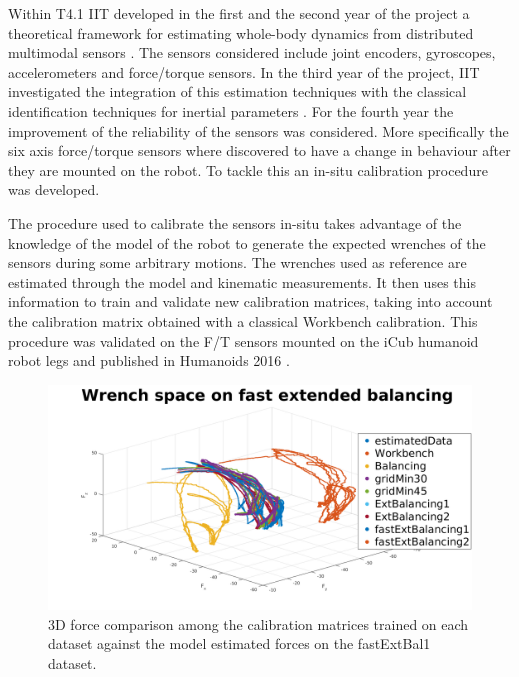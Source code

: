 Within T4.1 IIT developed in the first and the second year of the 
project a theoretical framework for estimating whole-body
dynamics from distributed multimodal sensors \cite{nori2015}. The sensors considered
include joint encoders, gyroscopes, accelerometers and force/torque sensors. In the third year of the project, IIT investigated the integration of this estimation techniques with the classical identification techniques for inertial parameters \cite{traversaro2015parametersEM}. For the fourth year the improvement of the reliability of the sensors was considered. More specifically the six axis force/torque sensors where discovered to have a change in behaviour after they are mounted on the robot. To tackle this an in-situ calibration procedure was developed.

The procedure used to calibrate the sensors in-situ takes advantage of the knowledge of the model of the robot to generate the expected wrenches of the sensors during some arbitrary motions. The wrenches used as reference are estimated through the model and kinematic measurements. It then uses this information to train and validate new calibration matrices, taking into account the calibration matrix obtained with a classical Workbench calibration.  This procedure was validated  on the F/T sensors mounted on the iCub humanoid robot legs and published in Humanoids 2016 \cite{Andrade}.


\begin{figure}
        \centering
        \includegraphics[width=.45\textwidth]{images/all1valid2.png}
        \caption{3D force comparison among the calibration matrices trained on each dataset against the model estimated forces on the fastExtBal1 dataset. }
        \label{fig:all1valid}
\end{figure}



%
%
